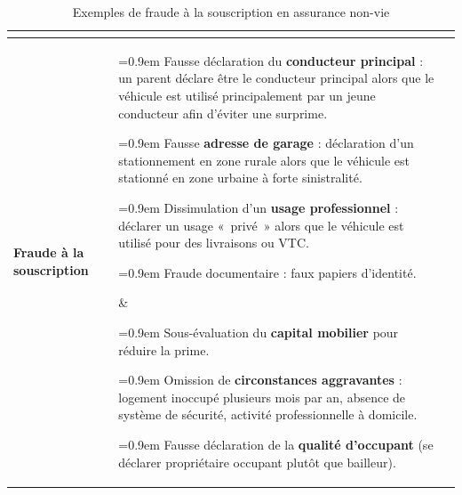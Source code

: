 \begin{table}[H]
    \centering
    \renewcommand{\arraystretch}{1.3}
    \setlength{\extrarowheight}{2pt}
    \renewcommand\tabularxcolumn[1]{m{#1}}   %
    \newcommand{\padV}{6pt}                  %
    \newcommand{\hautCell}{\vspace*{\padV}}
    \newcommand{\basCell}{\vspace*{\dimexpr\padV-4pt\relax}}
    \newcommand{\puce}[1]{%
        \leavevmode\hspace{0.3em}%
        \parbox[t]{\dimexpr\linewidth-0.9em\relax}{%
            \hangindent=0.9em\hangafter=1%
            \makebox[0.9em][l]{$\bullet$}#1\par}%
        \vspace{4pt}%
    }
    \begin{tabularx}{\textwidth}{%
        |>{\centering\arraybackslash}m{2.4cm}%
        |>{\raggedright\arraybackslash}X%
        |>{\raggedright\arraybackslash}X|}
        \hline
        \rowcolor{accenture}
        \textcolor{white}{\textbf{}}
        & \multicolumn{1}{c|}{\textcolor{white}{\textbf{Assurance automobile}}}
        & \multicolumn{1}{c|}{\textcolor{white}{\textbf{Assurance habitation}}} \\
        \hline
        \textbf{Fraude à la souscription}
        &
        \hautCell
        \puce{Fausse déclaration du \textbf{conducteur principal} : un parent déclare être le conducteur principal alors que le véhicule est utilisé principalement par un jeune conducteur afin d'éviter une surprime.}
        \puce{Fausse \textbf{adresse de garage} : déclaration d'un stationnement en zone rurale alors que le véhicule est stationné en zone urbaine à forte sinistralité.}
        \puce{Dissimulation d'un \textbf{usage professionnel} : déclarer un usage «~privé~» alors que le véhicule est utilisé pour des livraisons ou VTC.}
        \puce{Fraude documentaire : faux papiers d'identité.}%
        \basCell
        &
        \hautCell
        \puce{Sous-évaluation du \textbf{capital mobilier} pour réduire la prime.}
        \puce{Omission de \textbf{circonstances aggravantes} : logement inoccupé plusieurs mois par an, absence de système de sécurité, activité professionnelle à domicile.}
        \puce{Fausse déclaration de la \textbf{qualité d'occupant} (se déclarer propriétaire occupant plutôt que bailleur).}%
        \basCell
        \\
        \hline
    \end{tabularx}
    \caption{Exemples de fraude à la souscription en assurance non-vie}
    \label{tab:fraude-souscription}
\end{table}

